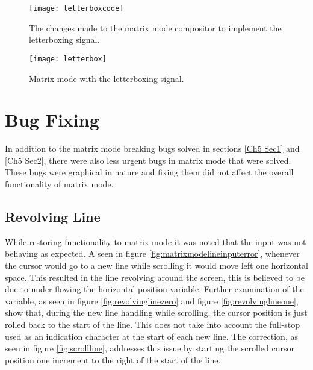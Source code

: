 \begin{figure}
  \centering
  \texttt{[image: letterboxcode]}
  \caption{The changes made to the matrix mode compositor to implement the letterboxing signal.}
  \label{fig:letterboxcode}
\end{figure}

\begin{figure}
  \centering
  \texttt{[image: letterbox]}
  \caption{Matrix mode with the letterboxing signal.}
  \label{fig:letterbox}
\end{figure}


\section{Bug Fixing}

\label{Ch5 Sec3}

In addition to the matrix mode breaking bugs solved in sections \ref{Ch5 Sec1} and \ref{Ch5 Sec2}, there were also less urgent bugs in matrix mode that were solved. These bugs were graphical in nature and fixing them did not affect the overall functionality of matrix mode.


\subsection{Revolving Line}

\label{Ch5 Sec3 Sub1}

While restoring functionality to matrix mode it was noted that the input was not behaving as expected. A seen in figure \ref{fig:matrixmodelineinputerror}, whenever the cursor would go to a new line while scrolling it would move left one horizontal space. This resulted in the line revolving around the screen, this is believed to be due to under-flowing the horizontal position variable. Further examination of the variable, as seen in figure \ref{fig:revolvinglinezero} and figure \ref{fig:revolvinglineone}, show that, during the new line handling while scrolling, the cursor position is just rolled back to the start of the line. This does not take into account the full-stop used as an indication character at the start of each new line. The correction, as seen in figure \ref{fig:scrollline}, addresses this issue by starting the scrolled cursor position one increment to the right of the start of the line.

